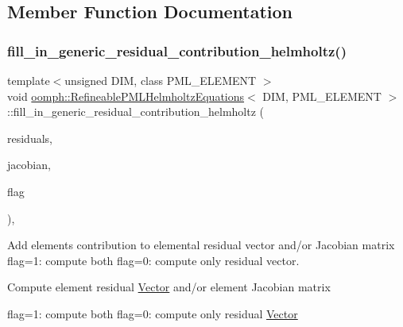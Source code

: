 \subsection{Member Function Documentation}
\mbox{\label{classoomph_1_1RefineablePMLHelmholtzEquations_aac773b707acf42233bd8b65ca6af5d5f}} 
\subsubsection{\texorpdfstring{fill\+\_\+in\+\_\+generic\+\_\+residual\+\_\+contribution\+\_\+helmholtz()}{fill\_in\_generic\_residual\_contribution\_helmholtz()}}
{\footnotesize\ttfamily template$<$unsigned D\+IM, class P\+M\+L\+\_\+\+E\+L\+E\+M\+E\+NT $>$ \\
void \hyperlink{classoomph_1_1RefineablePMLHelmholtzEquations}{oomph\+::\+Refineable\+P\+M\+L\+Helmholtz\+Equations}$<$ D\+IM, P\+M\+L\+\_\+\+E\+L\+E\+M\+E\+NT $>$\+::fill\+\_\+in\+\_\+generic\+\_\+residual\+\_\+contribution\+\_\+helmholtz (\begin{DoxyParamCaption}\item[{\hyperlink{classoomph_1_1Vector}{Vector}$<$ double $>$ \&}]{residuals,  }\item[{\hyperlink{classoomph_1_1DenseMatrix}{Dense\+Matrix}$<$ double $>$ \&}]{jacobian,  }\item[{const unsigned \&}]{flag }\end{DoxyParamCaption})\hspace{0.3cm}{\ttfamily [private]}, {\ttfamily [virtual]}}



Add element\textquotesingle{}s contribution to elemental residual vector and/or Jacobian matrix flag=1\+: compute both flag=0\+: compute only residual vector. 

Compute element residual \hyperlink{classoomph_1_1Vector}{Vector} and/or element Jacobian matrix

flag=1\+: compute both flag=0\+: compute only residual \hyperlink{classoomph_1_1Vector}{Vector}

